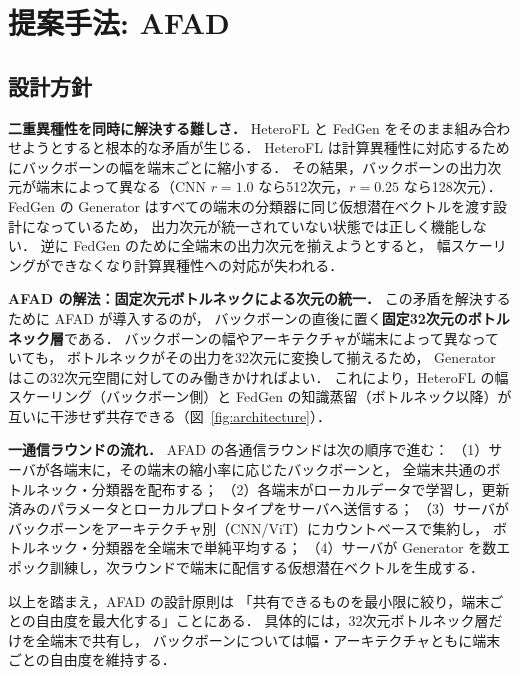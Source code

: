 \documentclass[Japanese,noauthor]{dicomopapers}
\begin{document}
\section{提案手法: AFAD}

\subsection{設計方針}

\textbf{二重異種性を同時に解決する難しさ．}
HeteroFL と FedGen をそのまま組み合わせようとすると根本的な矛盾が生じる．
HeteroFL は計算異種性に対応するためにバックボーンの幅を端末ごとに縮小する．
その結果，バックボーンの出力次元が端末によって異なる（CNN $r=1.0$ なら512次元，$r=0.25$ なら128次元）．
FedGen の Generator はすべての端末の分類器に同じ仮想潜在ベクトルを渡す設計になっているため，
出力次元が統一されていない状態では正しく機能しない．
逆に FedGen のために全端末の出力次元を揃えようとすると，
幅スケーリングができなくなり計算異種性への対応が失われる．

\textbf{AFAD の解法：固定次元ボトルネックによる次元の統一．}
この矛盾を解決するために AFAD が導入するのが，
バックボーンの直後に置く\textbf{固定32次元のボトルネック層}である．
バックボーンの幅やアーキテクチャが端末によって異なっていても，
ボトルネックがその出力を32次元に変換して揃えるため，
Generator はこの32次元空間に対してのみ働きかければよい．
これにより，HeteroFL の幅スケーリング（バックボーン側）と
FedGen の知識蒸留（ボトルネック以降）が互いに干渉せず共存できる（図~\ref{fig:architecture}）．

\textbf{一通信ラウンドの流れ．}
AFAD の各通信ラウンドは次の順序で進む：
（1）サーバが各端末に，その端末の縮小率に応じたバックボーンと，
全端末共通のボトルネック・分類器を配布する；
（2）各端末がローカルデータで学習し，更新済みのパラメータとローカルプロトタイプをサーバへ送信する；
（3）サーバがバックボーンをアーキテクチャ別（CNN/ViT）にカウントベースで集約し，
ボトルネック・分類器を全端末で単純平均する；
（4）サーバが Generator を数エポック訓練し，次ラウンドで端末に配信する仮想潜在ベクトルを生成する．

以上を踏まえ，AFAD の設計原則は
「共有できるものを最小限に絞り，端末ごとの自由度を最大化する」ことにある．
具体的には，32次元ボトルネック層だけを全端末で共有し，
バックボーンについては幅・アーキテクチャともに端末ごとの自由度を維持する．
\end{document}
